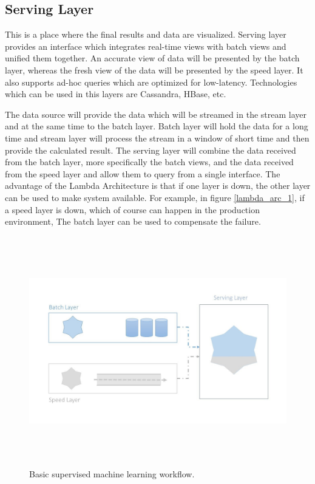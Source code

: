 \subsection{Serving Layer}
This is a place where the final results and data are visualized. Serving layer provides an interface which integrates real-time views with batch views and unified them together. An accurate view of data will be presented by the batch layer, whereas the fresh view of the data will be presented by the speed layer. It also supports ad-hoc queries which are optimized for low-latency. Technologies which can be used in this layers are Cassandra, HBase, etc.

The data source will provide the data which will be streamed in the stream layer and at the same time to the batch layer. Batch layer will hold the data for a long time and stream layer will process the stream in a window of short time and then provide the calculated result. The serving layer will combine the data received from the batch layer, more specifically the batch views, and the data received from the speed layer and allow them to query from a single interface. The advantage of the Lambda Architecture is that if one layer is down, the other layer can be used to make system available. For example, in figure \ref{lambda_arc_1}, if a speed layer is down, which of course can happen in the production environment, The batch layer can be used to compensate the failure.


\begin{figure}[htpb]
	\centering
	\includegraphics[width=12cm,height=10cm,keepaspectratio=true]{images/lambda_arc_1}
	\caption{
		Basic supervised machine learning workflow.
	}
	\label{fig:lambda_arc_1}
\end{figure}

